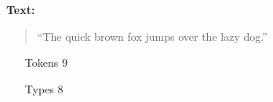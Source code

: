 \textbf {Text:}
\begin{quote}
 “\color{blue}The \color{red} quick brown fox jumps over \color{blue} the \color{red} lazy dog\color{black}.”
\end{quote}
\begin{itemize}
	\item[Tokens] 9
	\item[Types] 8
\end{itemize}